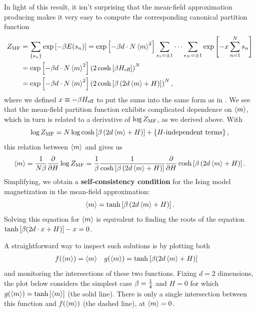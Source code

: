 \newpage %
In light of this result, it isn't surprising that the mean-field approximation producing  makes it very easy to compute the corresponding canonical partition function
\begin{align}
  Z_{\text{MF}} & = \sum_{\left\{s_n\right\}} \exp\left[-\beta E(s_n)\right] = \exp\left[-\beta d\cdot N \left\langle m \right\rangle^2\right] \sum_{s_1 = \pm 1} \cdots \sum_{s_N = \pm 1} \exp\left[-x \sum_{n = 1}^N s_n\right] \cr
       & = \exp\left[-\beta d\cdot N \left\langle m \right\rangle^2\right] \left(2\cosh\left[\beta H_{\text{eff}}\right]\right)^N \nonumber \\
       & = \exp\left[-\beta d\cdot N \left\langle m \right\rangle^2\right] \left(2\cosh\left[\beta \left(2d\left\langle m \right\rangle + H\right)\right]\right)^N,
\end{align}
where we defined $x \equiv -\beta H_{\text{eff}}$ to put the sums into the same form as in .
We see that the mean-field partition function exhibits complicated dependence on $\left\langle m \right\rangle$, which in turn is related to a derivative of $\log Z_{\text{MF}}$, as we derived above.
With
\begin{equation*}
  \log Z_{\text{MF}} = N\log \cosh\left[\beta \left(2d\left\langle m \right\rangle + H\right)\right] + \left\{H\mbox{-independent terms}\right\},
\end{equation*}
this relation between $\left\langle m \right\rangle$ and \ZMF gives us
\begin{equation*}
  \left\langle m \right\rangle = \frac{1}{N\beta} \frac{\partial }{\partial H}\log Z_{\text{MF}} = \frac{1}{\beta} \frac{1}{\cosh\left[\beta \left(2d\left\langle m \right\rangle + H\right)\right]} \frac{\partial }{\partial H}\cosh\left[\beta \left(2d\left\langle m \right\rangle + H\right)\right].
\end{equation*}
Simplifying, we obtain a \textbf{self-consistency condition} for the Ising model magnetization in the mean-field approximation:
\begin{equation}
  \label{eq:consistency}
  \left\langle m \right\rangle = \tanh\left[\beta \left(2d\left\langle m \right\rangle + H\right)\right].
\end{equation}
Solving this equation for $\left\langle m \right\rangle$ is equivalent to finding the roots of the equation $\tanh\left[\beta (2d\cdot x + H)\right] - x = 0$.

A straightforward way to inspect such solutions is by plotting both
\begin{align*}
  f(\left\langle m \right\rangle) & = \left\langle m \right\rangle &
  g(\left\langle m \right\rangle) & = \tanh\left[\beta (2d\left\langle m \right\rangle + H)\right]
\end{align*}
and monitoring the intersections of these two functions.
Fixing $d = 2$ dimensions, the plot below considers the simplest case $\beta = \frac{1}{4}$ and $H = 0$ for which $g(\left\langle m \right\rangle) = \tanh\left[\left\langle m \right\rangle\right]$ (the solid line).
There is only a single intersection between this function and $f(\left\langle m \right\rangle)$ (the dashed line), at $\left\langle m \right\rangle = 0$.

